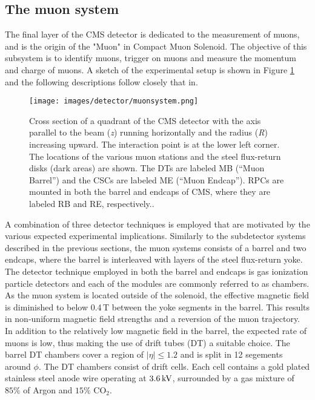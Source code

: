 \subsection{The muon system}
The final layer of the CMS detector is dedicated to the measurement of muons, and is the origin of the "Muon" in Compact Muon Solenoid. 
The objective of this subsystem is to identify muons, trigger on muons and measure the momentum and charge of muons. 
A sketch of the experimental setup is shown in Figure \ref{fig:Muon} and the following descriptions follow closely that in\cite{Chatrchyan:2012xi}. 
\begin{figure}[!htp]
  \centering
   \texttt{[image: images/detector/muonsystem.png]}
   \caption{Cross section of a quadrant of the CMS detector with the axis parallel to the beam (\textit{z}) running horizontally and the radius (\textit{R}) increasing upward. The interaction point is at the lower left corner. The locations of the various muon stations and the steel flux-return disks (dark areas) are shown. The DTs are labeled MB (``Muon Barrel'') and the CSCs are labeled ME (``Muon Endcap''). RPCs are mounted in both the barrel and endcaps of CMS, where they are labeled RB and RE, respectively.\cite{Chatrchyan:2012xi}.}
   \label{fig:Muon}
\end{figure}                                                                                            
A combination of three detector techniques is employed that are motivated by the various expected experimental implications. 
Similarly to the subdetector systems described in the previous sections, the muon systems consists of a barrel and two endcaps, where the barrel is interleaved with layers of the steel flux-return yoke. 
The detector technique employed in both the barrel and endcaps is gas ionization particle detectors and each of the modules are commonly referred to as chambers. 
As the muon system is located outside of the solenoid, the effective magnetic field is diminished to below 0.4$\,$T between the yoke segments in the barrel. 
This results in non-uniform magnetic field strengths and a reversion of the muon trajectory. 
In addition to the relatively low magnetic field in the barrel, the expected rate of muons is low, thus making the use of drift tubes (DT) a suitable choice. 
The barrel DT chambers cover a region of $|\eta|\leq1.2$ and is split in 12 segements around $\phi$. 
The DT chambers consist of drift cells. 
Each cell contains a gold plated stainless steel anode wire operating at $3.6\,\text{k\hspace{-.08em}V}$, surrounded by a gas mixture of $85\%$ of Argon and $15\%$ $\mathrm{CO_{2}}$. 
